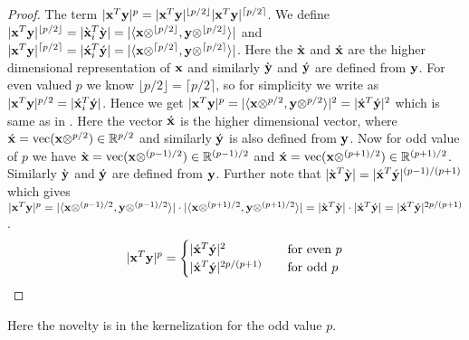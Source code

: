 \begin{proof}{\label{proof:kernel}}
The term $|\mathbf{x}^{T}\mathbf{y}|^{p}=|\mathbf{x}^{T}\mathbf{y}|^{\lfloor p/2 \rfloor}|\mathbf{x}^{T}\mathbf{y}|^{\lceil p/2 \rceil}$. We define $|\mathbf{x}^{T}\mathbf{y}|^{\lfloor p/2 \rfloor} = |\grave{\mathbf{x}}_{i}^{T}\grave{\mathbf{y}}| = |\langle \mathbf{x} \otimes^{\lfloor p/2 \rfloor}, \mathbf{y} \otimes^{\lfloor p/2 \rfloor} \rangle|$ and $|\mathbf{x}^{T}\mathbf{y}|^{\lceil p/2 \rceil} = |\acute{\mathbf{x}}_{i}^{T}\acute{\mathbf{y}}| = |\langle \mathbf{x} \otimes^{\lceil p/2 \rceil}, \mathbf{y} \otimes^{\lceil p/2 \rceil} \rangle|$. Here the $\grave{\mathbf{x}}$ and $\acute{\mathbf{x}}$ are the higher dimensional representation of $\mathbf{x}$ and similarly $\grave{\mathbf{y}}$ and $\acute{\mathbf{y}}$ are defined from $\mathbf{y}$. For even valued $p$ we know $\lfloor p/2 \rfloor=\lceil p/2 \rceil$, so for simplicity we write as $|\mathbf{x}^{T}\mathbf{y}|^{p/2} = |\acute{\mathbf{x}}_{i}^{T}\acute{\mathbf{y}}|$. Hence we get $|\mathbf{x}^{T}\mathbf{y}|^{p} = |\langle \mathbf{x} \otimes^{p/2}, \mathbf{y} \otimes^{p/2} \rangle|^{2} = |\acute{\mathbf{x}}^{T}\acute{\mathbf{y}}|^{2}$ which is same as in \cite{schechtman2011tight}. Here the vector $\acute{\mathbf{x}}$ is the higher dimensional vector, where $\acute{\mathbf{x}} = \mbox{vec}(\mathbf{x} \otimes^{p/2}) \in \mathbb{R}^{p/2}$ and similarly $\acute{\mathbf{y}}$ is also defined from $\mathbf{y}$. Now for odd value of $p$ we have $\grave{\mathbf{x}} = \mbox{vec}(\mathbf{x} \otimes^{(p-1)/2}) \in \mathbb{R}^{(p-1)/2}$ and $\acute{\mathbf{x}} = \mbox{vec}(\mathbf{x} \otimes^{(p+1)/2}) \in \mathbb{R}^{(p+1)/2}$. Similarly $\grave{\mathbf{y}}$ and $\acute{\mathbf{y}}$ are defined from $\mathbf{y}$. Further note that $|\grave{\mathbf{x}}^{T}\grave{\mathbf{y}}| = |\acute{\mathbf{x}}^{T}\acute{\mathbf{y}}|^{(p-1)/(p+1)}$ which gives $|\mathbf{x}^{T}\mathbf{y}|^{p} = |\langle \mathbf{x} \otimes^{(p-1)/2}, \mathbf{y} \otimes^{(p-1)/2} \rangle|\cdot|\langle \mathbf{x} \otimes^{(p+1)/2}, \mathbf{y} \otimes^{(p+1)/2} \rangle| = |\grave{\mathbf{x}}^{T}\grave{\mathbf{y}}|\cdot|\acute{\mathbf{x}}^{T}\acute{\mathbf{y}}| = |\acute{\mathbf{x}}^{T}\acute{\mathbf{y}}|^{2p/(p+1)}$. 
\[|\mathbf{x}^{T}\mathbf{y}|^{p} =
  \begin{cases}
  |\acute{\mathbf{x}}^{T}\acute{\mathbf{y}}|^{2}  & \quad \text{for even } p \\
  |\acute{\mathbf{x}}^{T}\acute{\mathbf{y}}|^{2p/(p+1)}  & \quad \text{for odd } p
  \end{cases}
\]
\end{proof}
% 
Here the novelty is in the kernelization for the odd value $p$. 

